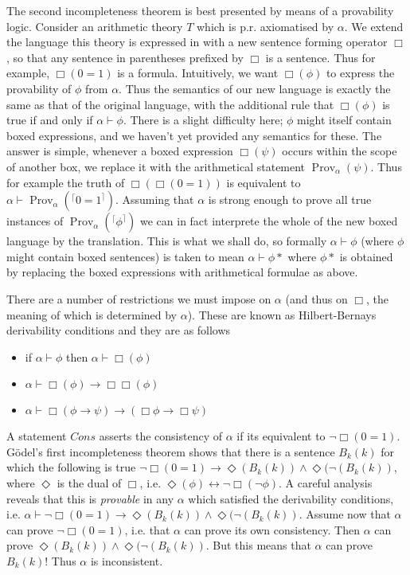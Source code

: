 \documentclass[12pt]{article}
\def\Prov{\operatorname{Prov}} %
\begin{document}
The second incompleteness theorem is best presented by means of a provability logic. 
Consider an arithmetic theory $T$ which is p.r. axiomatised by $\alpha$. 
We extend the language this theory is expressed in with a new sentence forming operator $\Box$, so that any sentence in parentheses prefixed by $\Box$ is a sentence. 
Thus for example, $\Box(0=1)$ is a formula. 
Intuitively, we want $\Box(\phi)$ to express the provability of $\phi$ from $\alpha$. 
Thus the semantics of our new language is exactly the same as that of the original language, with the additional rule that $\Box(\phi)$ is true if and only if $\alpha \vdash \phi$. 
There is a slight difficulty here; $\phi$ might itself contain boxed expressions, and we haven't yet provided any semantics for these. 
The answer is simple, whenever a boxed expression $\Box(\psi)$ occurs within the scope of another box, we replace it with the arithmetical statement $\Prov_\alpha(\psi)$. 
Thus for example the truth of $\Box(\Box(0=1))$ is equivalent to $\alpha \vdash \Prov_\alpha(^\lceil 0=1 ^\rceil)$. Assuming that $\alpha$ is strong enough to prove all true instances of $\Prov_\alpha(^\lceil\phi^\rceil)$ we can in fact interprete the whole of the new boxed language by the translation. 
This is what we shall do, so formally $\alpha \vdash \phi$ (where $\phi$ might contain boxed sentences) is taken to mean $\alpha \vdash \phi*$ where $\phi*$ is obtained by replacing the boxed expressions with arithmetical formulae as above.

There are a number of restrictions we must impose on $\alpha$ (and thus on $\Box$, the meaning of which is determined by $\alpha$). 
These are known as Hilbert-Bernays derivability conditions and they are as follows

\begin{itemize}
 \item if $\alpha \vdash \phi$ then $\alpha \vdash \Box(\phi)$
 \item $\alpha \vdash \Box(\phi) \rightarrow \Box\Box(\phi)$
 \item $\alpha \vdash \Box(\phi \rightarrow \psi) \rightarrow (\Box\phi\rightarrow\Box\psi)$
\end{itemize}

A statement $Cons$ asserts the consistency of $\alpha$ if its equivalent to $\neg\Box(0=1)$. G\"odel's first incompleteness theorem shows that there is a sentence $B_k(k)$ for which the following is true $\neg\Box(0=1) \rightarrow \Diamond(B_k(k)) \wedge \Diamond(\neg(B_k(k))$, where $\Diamond$ is the dual of $\Box$, i.e. $\Diamond(\phi) \leftrightarrow \neg\Box(\neg\phi)$. A careful analysis reveals that this is {\em provable} in any $\alpha$ which satisfied the derivability conditions, i.e. $\alpha \vdash \neg\Box(0=1) \rightarrow \Diamond(B_k(k)) \wedge \Diamond(\neg(B_k(k))$. Assume now that $\alpha$ can prove $\neg\Box(0=1)$, i.e. that $\alpha$ can prove its own consistency. Then $\alpha$ can prove $\Diamond(B_k(k)) \wedge \Diamond(\neg(B_k(k))$. But this means that $\alpha$ can prove $B_k(k)$! Thus $\alpha$ is inconsistent.
\end{document}
